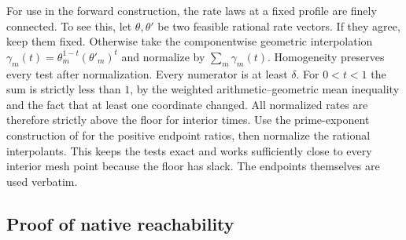 For use in the forward construction, the rate laws at a fixed
profile are finely connected. To see this, let \(\theta,\theta'\)
be two feasible rational rate vectors. If they agree, keep them fixed.
Otherwise take the componentwise geometric interpolation
\(\gamma_m(t)=\theta_m^{1-t}(\theta'_m)^t\) and normalize by
\(\sum_m\gamma_m(t)\). Homogeneity preserves every test after
normalization. Every numerator is at least \(\delta\).
For \(0<t<1\) the sum is strictly less than \(1\), by the
weighted arithmetic--geometric mean inequality and the fact that at
least one coordinate changed. All normalized rates are therefore
strictly above the floor for interior times. Use the prime-exponent
construction of  for the positive endpoint
ratios, then normalize the rational interpolants. This keeps the tests
exact and works sufficiently close to every interior mesh point
because the floor has slack. The endpoints themselves are used
verbatim.

\subsection{Proof of native reachability}

